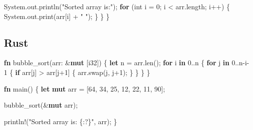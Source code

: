 \documentclass[
  letterpaper,
  DIV=11,
  numbers=noendperiod]{scrreprt}
\newenvironment{Shaded}{\begin{snugshade}}{\end{snugshade}}
\newcommand{\BuiltInTok}[1]{\textcolor[rgb]{0.00,0.23,0.31}{#1}}
\newcommand{\ControlFlowTok}[1]{\textcolor[rgb]{0.00,0.23,0.31}{\textbf{#1}}}
\newcommand{\DataTypeTok}[1]{\textcolor[rgb]{0.68,0.00,0.00}{#1}}
\newcommand{\DecValTok}[1]{\textcolor[rgb]{0.68,0.00,0.00}{#1}}
\newcommand{\FunctionTok}[1]{\textcolor[rgb]{0.28,0.35,0.67}{#1}}
\newcommand{\KeywordTok}[1]{\textcolor[rgb]{0.00,0.23,0.31}{\textbf{#1}}}
\newcommand{\NormalTok}[1]{\textcolor[rgb]{0.00,0.23,0.31}{#1}}
\newcommand{\OperatorTok}[1]{\textcolor[rgb]{0.37,0.37,0.37}{#1}}
\newcommand{\PreprocessorTok}[1]{\textcolor[rgb]{0.68,0.00,0.00}{#1}}
\newcommand{\StringTok}[1]{\textcolor[rgb]{0.13,0.47,0.30}{#1}}
\begin{document}
\begin{Shaded}
\begin{Highlighting}[]
        \BuiltInTok{System}\OperatorTok{.}\FunctionTok{out}\OperatorTok{.}\FunctionTok{println}\OperatorTok{(}\StringTok{"Sorted array is:"}\OperatorTok{);}
        \ControlFlowTok{for} \OperatorTok{(}\DataTypeTok{int}\NormalTok{ i }\OperatorTok{=} \DecValTok{0}\OperatorTok{;}\NormalTok{ i }\OperatorTok{\textless{}}\NormalTok{ arr}\OperatorTok{.}\FunctionTok{length}\OperatorTok{;}\NormalTok{ i}\OperatorTok{++)} \OperatorTok{\{}
            \BuiltInTok{System}\OperatorTok{.}\FunctionTok{out}\OperatorTok{.}\FunctionTok{print}\OperatorTok{(}\NormalTok{arr}\OperatorTok{[}\NormalTok{i}\OperatorTok{]} \OperatorTok{+} \StringTok{" "}\OperatorTok{);}
        \OperatorTok{\}}
    \OperatorTok{\}}
\OperatorTok{\}}
\end{Highlighting}
\end{Shaded}

\subsection{Rust}\label{rust}

\begin{Shaded}
\begin{Highlighting}[]
\KeywordTok{fn}\NormalTok{ bubble\_sort(arr}\OperatorTok{:} \OperatorTok{\&}\KeywordTok{mut}\NormalTok{ [}\DataTypeTok{i32}\NormalTok{]) }\OperatorTok{\{}
    \KeywordTok{let}\NormalTok{ n }\OperatorTok{=}\NormalTok{ arr}\OperatorTok{.}\NormalTok{len()}\OperatorTok{;}
    \ControlFlowTok{for}\NormalTok{ i }\KeywordTok{in} \DecValTok{0}\OperatorTok{..}\NormalTok{n }\OperatorTok{\{}
        \ControlFlowTok{for}\NormalTok{ j }\KeywordTok{in} \DecValTok{0}\OperatorTok{..}\NormalTok{n}\OperatorTok{{-}}\NormalTok{i}\OperatorTok{{-}}\DecValTok{1} \OperatorTok{\{}
            \ControlFlowTok{if}\NormalTok{ arr[j] }\OperatorTok{\textgreater{}}\NormalTok{ arr[j}\OperatorTok{+}\DecValTok{1}\NormalTok{] }\OperatorTok{\{}
\NormalTok{                arr}\OperatorTok{.}\NormalTok{swap(j}\OperatorTok{,}\NormalTok{ j}\OperatorTok{+}\DecValTok{1}\NormalTok{)}\OperatorTok{;}
            \OperatorTok{\}}
        \OperatorTok{\}}
    \OperatorTok{\}}
\OperatorTok{\}}

\KeywordTok{fn}\NormalTok{ main() }\OperatorTok{\{}
    \KeywordTok{let} \KeywordTok{mut}\NormalTok{ arr }\OperatorTok{=}\NormalTok{ [}\DecValTok{64}\OperatorTok{,} \DecValTok{34}\OperatorTok{,} \DecValTok{25}\OperatorTok{,} \DecValTok{12}\OperatorTok{,} \DecValTok{22}\OperatorTok{,} \DecValTok{11}\OperatorTok{,} \DecValTok{90}\NormalTok{]}\OperatorTok{;}

\NormalTok{    bubble\_sort(}\OperatorTok{\&}\KeywordTok{mut}\NormalTok{ arr)}\OperatorTok{;}

    \PreprocessorTok{println!}\NormalTok{(}\StringTok{"Sorted array is: \{:?\}"}\OperatorTok{,}\NormalTok{ arr)}\OperatorTok{;}
\OperatorTok{\}}
\end{Highlighting}
\end{Shaded}
\end{document}
